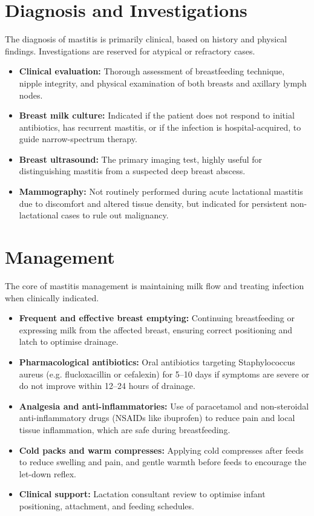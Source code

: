 \section*{Diagnosis and Investigations}
The diagnosis of mastitis is primarily clinical, based on history and physical findings. Investigations are reserved for atypical or refractory cases.
\begin{itemize}
    \item \textbf{Clinical evaluation:} Thorough assessment of breastfeeding technique, nipple integrity, and physical examination of both breasts and axillary lymph nodes.
    \item \textbf{Breast milk culture:} Indicated if the patient does not respond to initial antibiotics, has recurrent mastitis, or if the infection is hospital-acquired, to guide narrow-spectrum therapy.
    \item \textbf{Breast ultrasound:} The primary imaging test, highly useful for distinguishing mastitis from a suspected deep breast abscess.
    \item \textbf{Mammography:} Not routinely performed during acute lactational mastitis due to discomfort and altered tissue density, but indicated for persistent non-lactational cases to rule out malignancy.
\end{itemize}

\section*{Management}
The core of mastitis management is maintaining milk flow and treating infection when clinically indicated.
\begin{itemize}
    \item \textbf{Frequent and effective breast emptying:} Continuing breastfeeding or expressing milk from the affected breast, ensuring correct positioning and latch to optimise drainage.
    \item \textbf{Pharmacological antibiotics:} Oral antibiotics targeting Staphylococcus aureus (e.g. flucloxacillin or cefalexin) for 5--10 days if symptoms are severe or do not improve within 12--24 hours of drainage.
    \item \textbf{Analgesia and anti-inflammatories:} Use of paracetamol and non-steroidal anti-inflammatory drugs (NSAIDs like ibuprofen) to reduce pain and local tissue inflammation, which are safe during breastfeeding.
    \item \textbf{Cold packs and warm compresses:} Applying cold compresses after feeds to reduce swelling and pain, and gentle warmth before feeds to encourage the let-down reflex.
    \item \textbf{Clinical support:} Lactation consultant review to optimise infant positioning, attachment, and feeding schedules.
\end{itemize}

